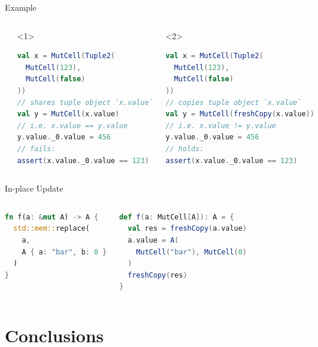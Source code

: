 \begin{frame}[fragile]{Example}
\begin{columns}[T]
\begin{lstlisting}[language=Rust]
let x = (
  123,
  false
);
// copies `x`
let mut y = x;

y.0 = 456;
// holds:
assert!(x.0 == 123)
\end{lstlisting}
\begin{onlyenv}<1>
\begin{lstlisting}[language=Scala]
val x = MutCell(Tuple2(
  MutCell(123),
  MutCell(false)
))
// shares tuple object `x.value`
val y = MutCell(x.value)
// i.e. x.value == y.value
y.value._0.value = 456
// fails:
assert(x.value._0.value == 123)
\end{lstlisting}
\end{onlyenv}
\begin{onlyenv}<2>
\begin{lstlisting}[language=Scala]
val x = MutCell(Tuple2(
  MutCell(123),
  MutCell(false)
))
// copies tuple object `x.value`
val y = MutCell(freshCopy(x.value))
// i.e. x.value != y.value
y.value._0.value = 456
// holds:
assert(x.value._0.value == 123)
\end{lstlisting}
\end{onlyenv}
\end{columns}
\end{frame}

\begin{frame}[fragile]{In-place Update}
\begin{columns}[T]
\begin{lstlisting}[language=Rust]
fn f(a: &mut A) -> A {
  std::mem::replace(
    a,
    A { a: "bar", b: 0 }
  )
}
\end{lstlisting}
\begin{lstlisting}[language=Scala]
def f(a: MutCell[A]): A = {
  val res = freshCopy(a.value)
  a.value = A(
    MutCell("bar"), MutCell(0)
  )
  freshCopy(res)
}
\end{lstlisting}
\end{columns}
\end{frame}


\section{Conclusions}

